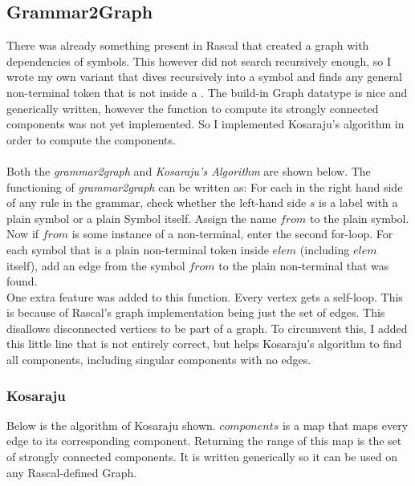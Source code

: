 \subsection{Grammar2Graph}
There was already something present in Rascal that created a graph with dependencies of symbols. This however did not search recursively enough, so I wrote my own variant that dives recursively into a symbol and finds any general non-terminal token that is not inside a . The build-in Graph datatype is nice and generically written, however the function to compute its strongly connected components was not yet implemented. So I implemented Kosaraju's algorithm in order to compute the components.\\\\
Both the \emph{grammar2graph} and \emph{Kosaraju's Algorithm} are shown below. The functioning of \textit{grammar2graph} can be written as: For each  in the right hand side of any rule in the grammar, check whether the left-hand side $s$ is a label with a plain symbol or a plain Symbol itself. Assign the name $from$ to the plain symbol. Now if $from$ is some instance of a non-terminal, enter the second for-loop. For each symbol that is a plain non-terminal token inside $elem$ (including $elem$ itself), add an edge from the symbol $from$ to the plain non-terminal that was found.\\
One extra feature was added to this function. Every vertex gets a self-loop. This is because of Rascal's graph implementation being just the set of edges. This disallows disconnected vertices to be part of a graph. To circumvent this, I added this little line that is not entirely correct, but helps Kosaraju's algorithm to find all components, including singular components with no edges.\pagebreak


\subsubsection{Kosaraju}
Below is the algorithm of Kosaraju shown. $components$ is a map that maps every edge to its corresponding component. Returning the range of this map is the set of strongly connected components. It is written generically so it can be used on any Rascal-defined Graph.


\pagebreak
